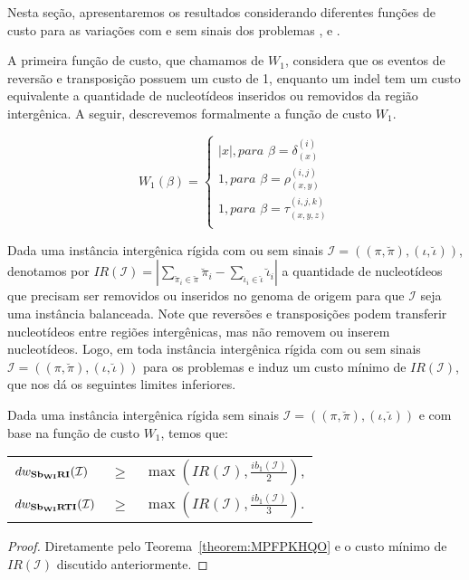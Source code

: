 Nesta seção, apresentaremos os resultados considerando diferentes funções de custo para as variações com e sem sinais dos problemas \SbWIRI{}, \SbWIRT{} e \SbWIRTI{}.

A primeira função de custo, que chamamos de $W_1$, considera que os eventos de reversão e transposição possuem um custo de 1, enquanto um indel tem um custo equivalente a quantidade de nucleotídeos inseridos ou removidos da região intergênica. A seguir, descrevemos formalmente a função de custo $W_1$.

$$
  W_1(\beta) = \begin{cases}
      |x|, \textit{para } \beta = \delta_{(x)}^{(i)} \\
      1, \textit{para } \beta = \rho_{(x,y)}^{(i,j)} \\
      1, \textit{para } \beta = \tau_{(x,y,z)}^{(i,j,k)} \\
  \end{cases}
$$

Dada uma instância intergênica rígida com ou sem sinais $\mathcal{I}=((\pi,\breve\pi),(\iota,\breve\iota))$, denotamos por $IR(\mathcal{I}) = |\sum_{\breve\pi_i \in \breve\pi} \breve\pi_i - \sum_{\breve\iota_i \in \breve\iota} \breve\iota_i|$ a quantidade de nucleotídeos que precisam ser removidos ou inseridos no genoma de origem para que $\mathcal{I}$ seja uma instância balanceada. Note que reversões e transposições podem transferir nucleotídeos entre regiões intergênicas, mas não removem ou inserem nucleotídeos. Logo, em toda instância intergênica rígida com ou sem sinais $\mathcal{I}=((\pi,\breve\pi),(\iota,\breve\iota))$ para os problemas \SbWIRI{} e \SbWIRTI{} induz um custo mínimo de $IR(\mathcal{I})$, que nos dá os seguintes limites inferiores.

\begin{theorem}\label{theorem:IQACALLP}
Dada uma instância intergênica rígida sem sinais $\mathcal{I}=((\pi,\breve\pi),(\iota,\breve\iota))$ e com base na função de custo $W_1$, temos que:

\begin{tabular}{lll}
  $dw_{\textbf{Sb\textsubscript{WI}RI}}(\mathcal{I})$      & $ \ge $ & $\max(IR(\mathcal{I}),\frac{ib_1(\mathcal{I})}{2})$, \\ 
  $dw_{\textbf{Sb\textsubscript{WI}RTI}}(\mathcal{I})$     & $ \ge $ & $\max(IR(\mathcal{I}),\frac{ib_1(\mathcal{I})}{3})$.
\end{tabular}
\begin{proof}
Diretamente pelo Teorema~\ref{theorem:MPFPKHQO} e o custo mínimo de $IR(\mathcal{I})$ discutido anteriormente.
\end{proof}
\end{theorem}


